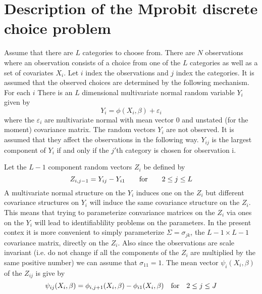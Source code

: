 
%
%
\section{Description of the Mprobit discrete choice problem}
Assume that there are $L$ categories to choose from. There are $N$
observations where an observation consists of a choice from one of the
$L$ categories as well as a set of covariates $X_i$. 
Let $i$ index the observations and 
$j$ index the categories. It is assumed that
the observed choices are determined by the following mechanism.
For each $i$  There is an $L$ dimensional
 multivariate normal random variable 
$Y_i$ given by
$$Y_i=\phi(X_i,\beta) +\varepsilon_i$$ 
where the $\varepsilon_i$ are multivariate normal with mean vector $0$
and unstated (for the moment) covariance matrix.
The random vectors $Y_i$ are not observed. It is assumed that
they affect the observations in the following way.
$Y_{ij}$ is the largest component of $Y_i$ if and only if
the $j'$th category is chosen for observation i.

Let the $L-1$ component random vectors $Z_i$ be defined by
$$Z_{i,j-1}=Y_{ij}-Y_{i1} \qquad\hbox{\rm for}\qquad 2\le j\le L$$
A multivariate normal structure on the $Y_i$ induces one on the
$Z_i$ but different covariance structures on $Y_i$ will induce the
same covariance structure on the $Z_i$.  This means that
trying to parameterize convariance matrices on the $Z_i$
via ones on the $Y_i$ will lead to identifiablility problems
on the parameters. In the present contex it is more convenient
to simply parameterize $\Sigma=\sigma_{jk}$,
the $L-1 \times L-1$ covariance matrix,
 directly
on the $Z_i$. Also since the observations are scale invariant
(i.e. do not change if all the components of the $Z_i$ are multiplied
by the same positive number) we can assume that  $\sigma_{11}=1$.
The mean vector $\psi_i(X_i,\beta)$ of the $Z_{ij}$ is give by
$$\psi_{ij}(X_i,\beta)=\phi_{i,j+1}(X_i,\beta)-\phi_{i1}(X_i,\beta)
 \quad \hbox{\rm for} \quad 2\le j\le J$$

